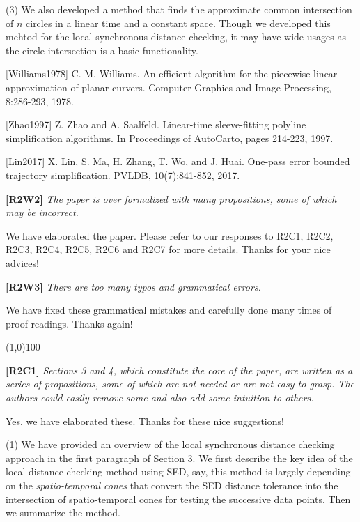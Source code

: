 \documentclass{letter}
\begin{document}
(3) We also developed a method that finds the approximate common intersection of $n$ circles in a linear time and a constant space. Though we developed this mehtod for the local synchronous distance checking, it may have wide usages as the circle intersection is a basic functionality.

[Williams1978] C. M. Williams. An efficient algorithm for the piecewise linear approximation of planar curvers. Computer Graphics and Image Processing, 8:286-293, 1978.

[Zhao1997]  Z. Zhao and A. Saalfeld. Linear-time sleeve-fitting polyline simplification algorithms. In Proceedings of AutoCarto, pages 214-223, 1997.

[Lin2017] X. Lin, S. Ma, H. Zhang, T. Wo, and J. Huai. One-pass error bounded trajectory simplification. PVLDB, 10(7):841-852, 2017.

\textbf{[R2W2]} \emph{The paper is over formalized with many propositions, some of which may be incorrect.}

We have elaborated the paper. Please refer to our responses to R2C1, R2C2, R2C3, R2C4, R2C5, R2C6 and R2C7 for more details. Thanks for your nice advices!

\textbf{[R2W3]} \emph{There are too many typos and grammatical errors.}

We have fixed these grammatical mistakes and carefully done many times of proof-readings. Thanks again!

\line(1,0){100}

\textbf{[R2C1]} \emph{Sections 3 and 4, which constitute the core of the paper, are written as a series of propositions, some of which are not needed or are not easy to grasp. The authors could easily remove some and also add some intuition to others.}

Yes, we have elaborated these. Thanks for these nice suggestions!

(1) We have provided an overview of the local synchronous distance checking approach in the first paragraph of Section 3. We first describe the key idea of the local distance checking method using SED, say, this method is largely depending on the \emph{spatio-temporal cones} that convert the SED distance tolerance into the intersection of spatio-temporal cones for testing the successive data points. Then we summarize the method. 
\end{document}
